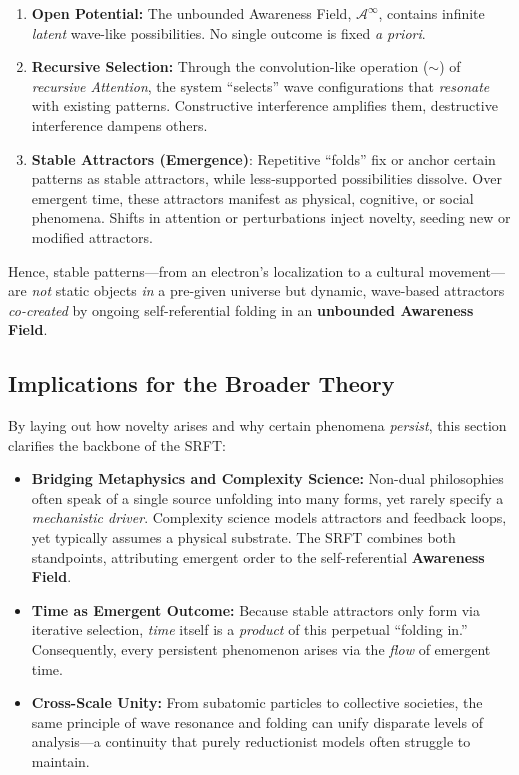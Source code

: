 \documentclass[12pt,a4paper]{article}
\begin{document}
\begin{enumerate}
    \item \textbf{Open Potential:} The unbounded Awareness Field, \(\mathscr{A}^\infty\),
    contains infinite \emph{latent} wave-like possibilities. No single outcome is fixed
    \emph{a priori}.
    \item \textbf{Recursive Selection:} Through the convolution-like operation
    (\(\sim\)) of \emph{recursive Attention}, the system “selects” wave configurations
    that \emph{resonate} with existing patterns. Constructive interference amplifies
    them, destructive interference dampens others.
    \item \textbf{Stable Attractors (Emergence)}: Repetitive “folds” fix or anchor
    certain patterns as stable attractors, while less-supported possibilities dissolve.
    Over emergent time, these attractors manifest as physical, cognitive, or social
    phenomena. Shifts in attention or perturbations inject novelty, seeding new or
    modified attractors.
\end{enumerate}

Hence, stable patterns---from an electron’s localization to a cultural movement---are
\emph{not} static objects \emph{in} a pre-given universe but dynamic, wave-based
attractors \emph{co-created} by ongoing self-referential folding in an \textbf{unbounded
Awareness Field}.

\subsection{Implications for the Broader Theory}
\label{subsec:emergent-implications}

By laying out how novelty arises and why certain phenomena \emph{persist}, this
section clarifies the backbone of the SRFT:
\begin{itemize}
    \item \textbf{Bridging Metaphysics and Complexity Science:} Non-dual philosophies
    often speak of a single source unfolding into many forms, yet rarely specify a
    \emph{mechanistic driver}. Complexity science models attractors and feedback loops,
    yet typically assumes a physical substrate. The SRFT combines both standpoints,
    attributing emergent order to the self-referential \textbf{Awareness Field}.
    \item \textbf{Time as Emergent Outcome:} Because stable attractors only form via
    iterative selection, \emph{time} itself is a \emph{product} of this perpetual
    “folding in.” Consequently, every persistent phenomenon arises via the \emph{flow}
    of emergent time.
    \item \textbf{Cross-Scale Unity:} From subatomic particles to collective societies,
    the same principle of wave resonance and folding can unify disparate levels of
    analysis---a continuity that purely reductionist models often struggle to maintain.
\end{itemize}
\end{document}
